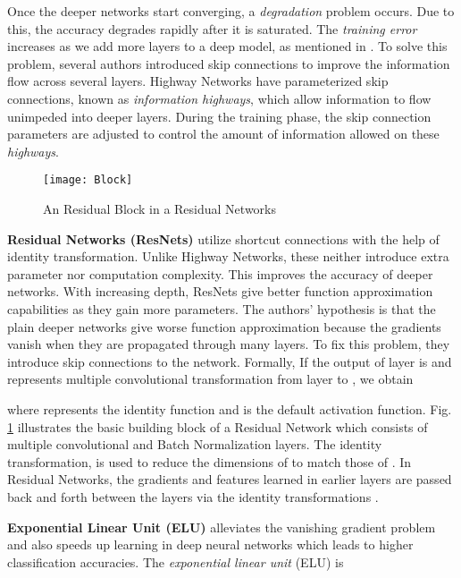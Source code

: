 \documentclass[10pt,twocolumn,letterpaper]{article}
\begin{document}
Once the deeper networks start converging, a \emph{degradation} problem occurs. Due to this, the accuracy degrades rapidly after it is saturated. The \emph{training error} increases as we add more layers to a deep model, as mentioned in \cite{[2]}. To solve this problem, several authors introduced skip connections to improve the information flow across several layers. Highway Networks \cite{[7]} have parameterized skip connections, known as \emph{information highways}, which allow information to flow unimpeded into deeper layers. During the training phase, the skip connection parameters are adjusted to control the amount of information allowed on these \emph{highways}.

\begin{figure}
\centering
\texttt{[image: Block]}
\caption{An  Residual Block in a Residual Networks}
\label{fig:resblock}
\end{figure}

\textbf{Residual Networks (ResNets)} \cite{[1]} utilize shortcut connections with the help of identity transformation. Unlike Highway Networks, these neither introduce extra parameter nor computation complexity. This improves the accuracy of deeper networks. With increasing depth, ResNets give better function approximation capabilities as they gain more parameters. The authors' hypothesis is that the plain deeper networks give worse function approximation because the gradients vanish when they are propagated through many layers. To fix this problem, they introduce skip connections to the network. Formally, If the output of  layer is  and  represents multiple convolutional transformation from layer  to , we obtain



where  represents the identity function and  \cite{[8]} is the default activation function. Fig. \ref{fig:resblock} illustrates the basic building block of a Residual Network which consists of multiple convolutional and Batch Normalization layers. The identity transformation,  is used to reduce the dimensions of  to match those of . In Residual Networks, the gradients and features learned in earlier layers are passed back and forth between the layers via the identity transformations .

\textbf{Exponential Linear Unit (ELU)} \cite{[9]} alleviates the vanishing gradient problem and also speeds up learning in deep neural networks which leads to higher classification accuracies. The \emph{exponential linear unit} (ELU) is
\end{document}
